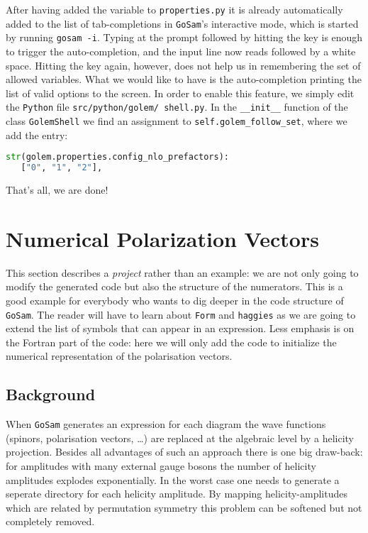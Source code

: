 \documentclass[11pt,a4paper]{refrep}
\newcommand{\golem}{{\tt GoSam}\xspace}
\newcommand{\form}{{\tt Form}\xspace}
\newcommand{\python}{{\tt Python}\xspace}
\newcommand{\haggies}{{\tt haggies}\xspace}
\begin{document}
After having added the variable to \texttt{properties.py} it is already
automatically added to the list of tab-completions in \golem{}'s interactive
mode, which is started by running \texttt{gosam -i}.
Typing  at the prompt followed by hitting the  key is
enough to trigger the auto-completion, and the input line now reads
 followed by a white space. Hitting the  key
again, however, does not help us in remembering the set of allowed variables.
What we would like to have is the auto-completion printing the list of
valid options to the screen. In order to enable this feature, we simply
edit the \python{} file
\texttt{src/\hspace{0pt}python/\hspace{0pt}golem/\hspace{0pt}%
shell.py}. In the \texttt{\_\_init\_\_} function of the class
\texttt{GolemShell} we find an assignment to
\texttt{self.golem\_follow\_set}, where we add the entry:
\begin{lstlisting}[language=Python]
str(golem.properties.config_nlo_prefactors):
   ["0", "1", "2"],
\end{lstlisting}
That's all, we are done!

\section{Numerical Polarization Vectors}
This section describes a \emph{project} rather than an example:
we are not only going to modify the generated code but also the
structure of the numerators. This is a good example for everybody who
wants to dig deeper in the code structure of \golem{}.
The reader will have to learn about \form{} and \haggies{} as we are going
to extend the list of symbols that can appear in an expression.
Less emphasis is on the Fortran part of the code: here we will only add
the code to initialize the numerical representation of the polarisation
vectors.

\subsection{Background}
When \golem{} generates an expression for each diagram the wave functions
(spinors, polarisation vectors, \dots) are replaced at the algebraic
level by a helicity projection. Besides all advantages of such an approach
there is one big draw-back: for amplitudes with many external gauge bosons
the number of helicity amplitudes explodes exponentially. In the worst case
one needs to generate a seperate directory for each helicity amplitude.
By mapping helicity-amplitudes which are related by permutation symmetry
this problem can be softened but not completely removed.
\end{document}
